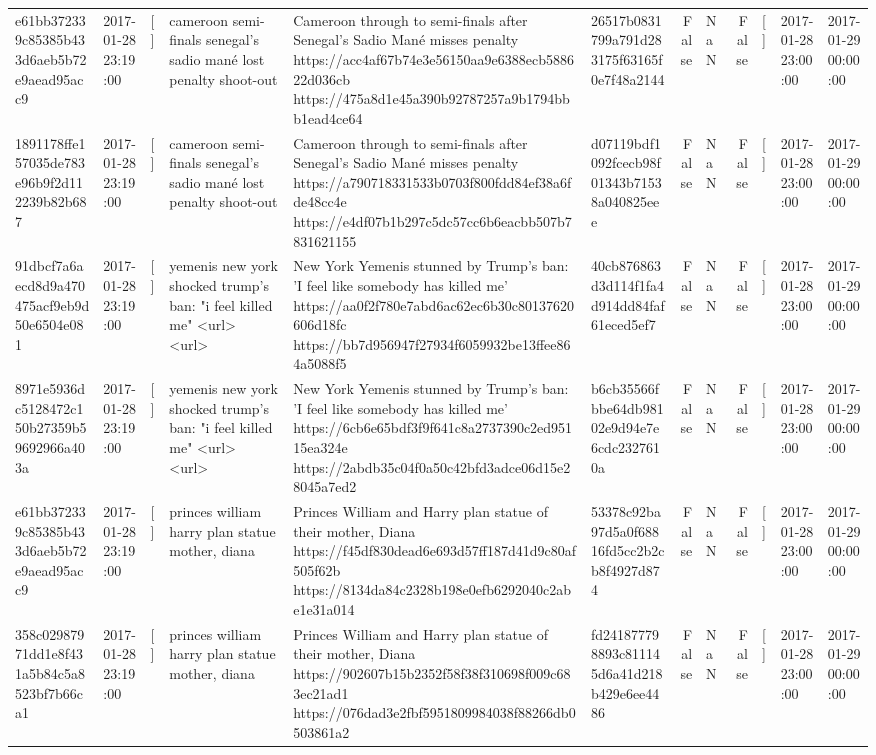 \begin{tabular}{llllllrlrlll}
e61bb372339c85385b433d6aeb5b72e9aead95acc9 & 2017-01-28 23:19:00 & [] & cameroon semi-finals senegal's sadio mané lost penalty shoot-out & Cameroon through to semi-finals after Senegal’s Sadio Mané misses penalty https://acc4af67b74e3e56150aa9e6388ecb588622d036cb https://475a8d1e45a390b92787257a9b1794bbb1ead4ce64 & 26517b0831799a791d283175f63165f0e7f48a2144 & False & NaN & False & [] & 2017-01-28 23:00:00 & 2017-01-29 00:00:00 \\
1891178ffe157035de783e96b9f2d112239b82b687 & 2017-01-28 23:19:00 & [] & cameroon semi-finals senegal's sadio mané lost penalty shoot-out & Cameroon through to semi-finals after Senegal’s Sadio Mané misses penalty https://a790718331533b0703f800fdd84ef38a6fde48cc4e https://e4df07b1b297c5dc57cc6b6eacbb507b7831621155 & d07119bdf1092fcecb98f01343b71538a040825eee & False & NaN & False & [] & 2017-01-28 23:00:00 & 2017-01-29 00:00:00 \\
91dbcf7a6aecd8d9a470475acf9eb9d50e6504e081 & 2017-01-28 23:19:00 & [] & yemenis new york shocked trump's ban: "i feel killed me" <url> <url> & New York Yemenis stunned by Trump's ban: 'I feel like somebody has killed me' https://aa0f2f780e7abd6ac62ec6b30c80137620606d18fc https://bb7d956947f27934f6059932be13ffee864a5088f5 & 40cb876863d3d114f1fa4d914dd84faf61eced5ef7 & False & NaN & False & [] & 2017-01-28 23:00:00 & 2017-01-29 00:00:00 \\
8971e5936dc5128472c150b27359b59692966a403a & 2017-01-28 23:19:00 & [] & yemenis new york shocked trump's ban: "i feel killed me" <url> <url> & New York Yemenis stunned by Trump's ban: 'I feel like somebody has killed me' https://6cb6e65bdf3f9f641c8a2737390c2ed95115ea324e https://2abdb35c04f0a50c42bfd3adce06d15e28045a7ed2 & b6cb35566fbbe64db98102e9d94e7e6cdc2327610a & False & NaN & False & [] & 2017-01-28 23:00:00 & 2017-01-29 00:00:00 \\
e61bb372339c85385b433d6aeb5b72e9aead95acc9 & 2017-01-28 23:19:00 & [] & princes william harry plan statue mother, diana & Princes William and Harry plan statue of their mother, Diana https://f45df830dead6e693d57ff187d41d9c80af505f62b https://8134da84c2328b198e0efb6292040c2abe1e31a014 & 53378c92ba97d5a0f68816fd5cc2b2cb8f4927d874 & False & NaN & False & [] & 2017-01-28 23:00:00 & 2017-01-29 00:00:00 \\
358c02987971dd1e8f431a5b84c5a8523bf7b66ca1 & 2017-01-28 23:19:00 & [] & princes william harry plan statue mother, diana & Princes William and Harry plan statue of their mother, Diana https://902607b15b2352f58f38f310698f009c683ec21ad1 https://076dad3e2fbf5951809984038f88266db0503861a2 & fd241877798893c811145d6a41d218b429e6ee4486 & False & NaN & False & [] & 2017-01-28 23:00:00 & 2017-01-29 00:00:00 \\

\end{tabular}
